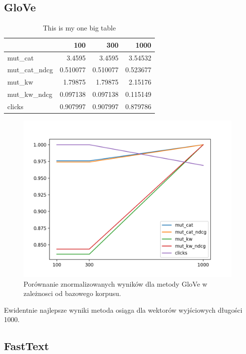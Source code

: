 \documentclass[pl]{minipw} %
\begin{document}
\subsection{GloVe}

\begin{table}
	\centering
	\begin{tabular}{lrrr}
		\hline
		&      100 &      300 &     1000 \\
		\hline
		mut\_cat      & 3.4595   & 3.4595   & 3.54532  \\
		mut\_cat\_ndcg & 0.510077 & 0.510077 & 0.523677 \\
		mut\_kw       & 1.79875  & 1.79875  & 2.15176  \\
		mut\_kw\_ndcg  & 0.097138 & 0.097138 & 0.115149 \\
		clicks       & 0.907997 & 0.907997 & 0.879786 \\
		\hline
	\end{tabular}
	\caption{This is my one big table}
\end{table}

\begin{figure}[H]
	\centering
	\includegraphics[width=1\textwidth]{img/results/gv_ctr.png}
	\caption{Porównanie znormalizowanych wyników dla metody GloVe w zależnosci od bazowego korpusu.}
\end{figure}

Ewidentnie najlepsze wyniki metoda osiąga dla wektorów wyjściowych długości 1000.

\subsection{FastText}
\end{document}
